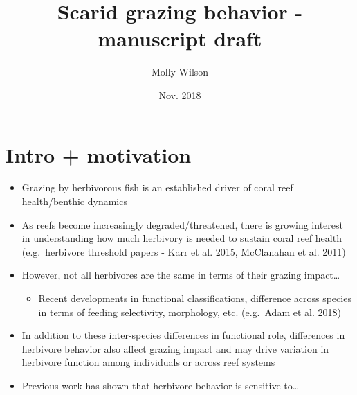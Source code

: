 \documentclass[]{article}
\title{Scarid grazing behavior - manuscript draft}
\author{Molly Wilson}
\date{Nov. 2018}
\providecommand{\tightlist}{%
  \setlength{\itemsep}{0pt}\setlength{\parskip}{0pt}}
\begin{document}
\maketitle

{
\setcounter{tocdepth}{2}
\tableofcontents
}
\section{Intro + motivation}\label{intro-motivation}

\begin{itemize}
\tightlist
\item
  Grazing by herbivorous fish is an established driver of coral reef
  health/benthic dynamics
\item
  As reefs become increasingly degraded/threatened, there is growing
  interest in understanding how much herbivory is needed to sustain
  coral reef health (e.g.~herbivore threshold papers - Karr et al. 2015,
  McClanahan et al. 2011)
\item
  However, not all herbivores are the same in terms of their grazing
  impact\ldots{}

  \begin{itemize}
  \tightlist
  \item
    Recent developments in functional classifications, difference across
    species in terms of feeding selectivity, morphology, etc. (e.g.~Adam
    et al. 2018)
  \end{itemize}
\item
  In addition to these inter-species differences in functional role,
  differences in herbivore behavior also affect grazing impact and may
  drive variation in herbivore function among individuals or across reef
  systems
\item
  Previous work has shown that herbivore behavior is sensitive
  to\ldots{}


\end{itemize}
\end{document}
